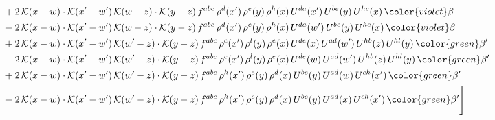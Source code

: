\begin{align}
& +2\,\mathcal{K}(x-w)\cdot \mathcal{K}(x'-w')\, \mathcal{K}(w-z)\cdot \mathcal{K}(y-z)\, f^{abc}\,\rho^{d}(x')\,\rho^{e}(y)\,\rho^{h}(x)\, U^{da}(x')\,U^{be}(y)\,U^{hc}(x)\,{\color{violet} \beta}\notag\\
& -2\,\mathcal{K}(x-w)\cdot \mathcal{K}(x'-w')\, \mathcal{K}(w-z)\cdot \mathcal{K}(y-z)\, f^{abc}\,\rho^{d}(x')\,\rho^{e}(y)\,\rho^{h}(x)\, U^{da}(w')\,U^{be}(y)\,U^{hc}(x)\,{\color{violet} \beta}\notag\\
&+2\,\mathcal{K}(x-w)\cdot\mathcal{K}(x'-w')\,\mathcal{K}(w'-z)\cdot\mathcal{K}(y-z)\, f^{abc}\,\rho^{c}(x')\,\rho^{l}(y)\,\rho^{e}(x)\,U^{de}(x)\,U^{ad}(w')\,U^{hb}(z)\,U^{hl}(y)\,{\color{green} \beta'}\notag \\ &-2\,\mathcal{K}(x-w)\cdot\mathcal{K}(x'-w')\,\mathcal{K}(w'-z)\cdot\mathcal{K}(y-z)\, f^{abc}\,\rho^{c}(x')\,\rho^{l}(y)\,\rho^{e}(x)\,U^{de}(w)\,U^{ad}(w')\,U^{hb}(z)\,U^{hl}(y)\,{\color{green} \beta'}\notag \\ & +2\,\mathcal{K}(x-w)\cdot\mathcal{K}(x'-w')\,\mathcal{K}(w'-z)\cdot\mathcal{K}(y-z)\, f^{abc}\,\rho^{h}(x')\,\rho^{e}(y)\,\rho^{d}(x)\,U^{be}(y)\,U^{ad}(w)\,U^{ch}(x')\,{\color{green} \beta'} \notag\\ & -2\,\mathcal{K}(x-w)\cdot\mathcal{K}(x'-w')\,\mathcal{K}(w'-z)\cdot\mathcal{K}(y-z)\, f^{abc}\,\rho^{h}(x')\,\rho^{e}(y)\,\rho^{d}(x)\,U^{be}(y)\,U^{ad}(x)\,U^{ch}(x')\,{\color{green} \beta'} \Bigg]
\end{align}
